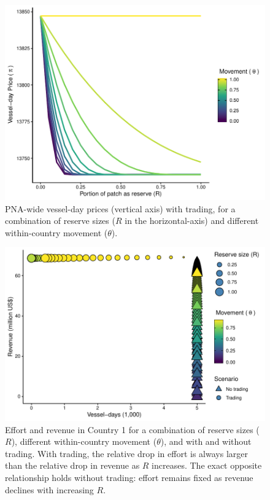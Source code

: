\documentclass[12pt]{article}
\begin{document}
\begin{figure}
\centering
\includegraphics{img/vessel_day_price_with_trading_plot.pdf}
\caption{\label{fig:vessel_day_price_with_trading_plot}PNA-wide vessel-day prices (vertical axis) with trading, for a combination of reserve sizes ($R$ in the horizontal-axis) and different within-country movement ($\theta$).}
\end{figure}

\begin{figure}
	\centering
	\includegraphics{img/effort_and_revenues.pdf}
	\caption{\label{fig:effort_and_revenues}Effort and revenue in Country 1 for a combination of reserve sizes ($R$), different within-country movement ($\theta$), and with and without trading. With trading, the relative drop in effort is always larger than the relative drop in revenue as $R$ increases. The exact opposite relationship holds without trading: effort remains fixed as revenue declines with increasing $R$.}
\end{figure}
\end{document}
